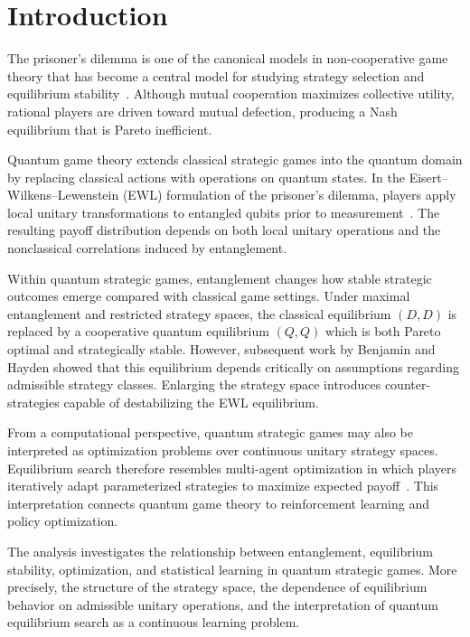 \section{Introduction}

The prisoner's dilemma is one of the canonical models in non-cooperative game theory that has become a central model for studying strategy selection and equilibrium stability~\cite{ferguson}. Although mutual cooperation maximizes collective utility, rational players are driven toward mutual defection, producing a Nash equilibrium that is Pareto inefficient.

Quantum game theory extends classical strategic games into the quantum domain by replacing classical actions with operations on quantum states. In the Eisert--Wilkens--Lewenstein (EWL) formulation of the prisoner's dilemma, players apply local unitary transformations to entangled qubits prior to measurement~\cite{ewl}. The resulting payoff distribution depends on both local unitary operations and the nonclassical correlations induced by entanglement.

Within quantum strategic games, entanglement changes how stable strategic outcomes emerge compared with classical game settings. Under maximal entanglement and restricted strategy spaces, the classical equilibrium $(D,D)$ is replaced by a cooperative quantum equilibrium $(Q,Q)$ which is both Pareto optimal and strategically stable. However, subsequent work by Benjamin and Hayden showed that this equilibrium depends critically on assumptions regarding admissible strategy classes. Enlarging the strategy space introduces counter-strategies capable of destabilizing the EWL equilibrium.

From a computational perspective, quantum strategic games may also be interpreted as optimization problems over continuous unitary strategy spaces. Equilibrium search therefore resembles multi-agent optimization in which players iteratively adapt parameterized strategies to maximize expected payoff~\cite{jankowski,lau,ikeda}. This interpretation connects quantum game theory to reinforcement learning and policy optimization.

The analysis investigates the relationship between entanglement, equilibrium stability, optimization, and statistical learning in quantum strategic games. More precisely, the structure of the strategy space, the dependence of equilibrium behavior on admissible unitary operations, and the interpretation of quantum equilibrium search as a continuous learning problem.